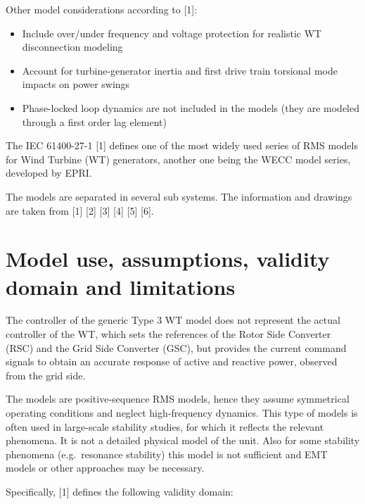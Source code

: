 \documentclass[
  a4paper,
  DIV=11,
  numbers=noendperiod]{scrartcl}
\providecommand{\tightlist}{%
  \setlength{\itemsep}{0pt}\setlength{\parskip}{0pt}}\usepackage{longtable,booktabs,array}
\begin{document}
Other model considerations according to {[}1{]}:

\begin{itemize}
\tightlist
\item
  Include over/under frequency and voltage protection for realistic WT
  disconnection modeling
\item
  Account for turbine-generator inertia and first drive train torsional
  mode impacts on power swings
\item
  Phase-locked loop dynamics are not included in the models (they are
  modeled through a first order lag element)
\end{itemize}

The IEC 61400-27-1 {[}1{]} defines one of the most widely used series of
RMS models for Wind Turbine (WT) generators, another one being the WECC
model series, developed by EPRI.

The models are separated in several sub systems. The information and
drawings are taken from {[}1{]} {[}2{]} {[}3{]} {[}4{]} {[}5{]} {[}6{]}.

\section{Model use, assumptions, validity domain and
limitations}\label{model-use-assumptions-validity-domain-and-limitations}

The controller of the generic Type 3 WT model does not represent the
actual controller of the WT, which sets the references of the
Rotor Side Converter (RSC) and the Grid Side Converter (GSC), but
provides the current command signals to obtain an accurate response of
active and reactive power, observed from the grid side.

The models are positive-sequence RMS models, hence they assume
symmetrical operating conditions and neglect high-frequency dynamics.
This type of models is often used in large-scale stability studies, for
which it reflects the relevant phenomena. It is not a detailed physical
model of the unit. Also for some stability phenomena (e.g.~resonance
stability) this model is not sufficient and EMT models or other
approaches may be necessary.

Specifically, {[}1{]} defines the following validity domain:
\end{document}
